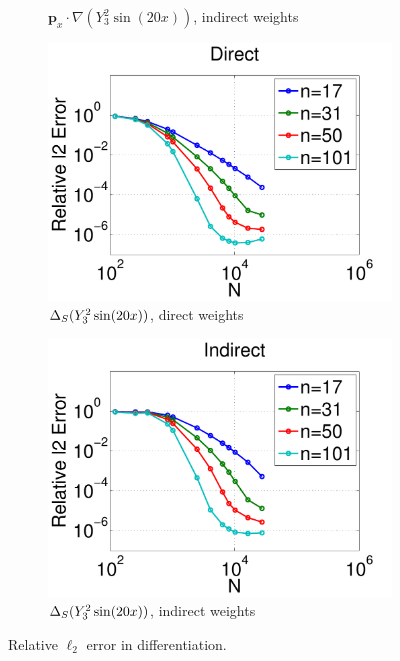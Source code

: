 \begin{figure}
\begin{subfigure}[t]{0.48\textwidth}
	\caption{$\mathbf{p}_{x} \cdot \nabla ( Y_{3}^{2} \sin(20 x))$, indirect weights}
		\label{fig:direct_vs_indirect_relative_error_xsfc_indirect}
	\end{subfigure}
	\begin{subfigure}[t]{0.48\textwidth}
	\includegraphics[width=1.0\textwidth]{../figures/appendices/direct_vs_indirect_weights/compare_weight_generation/lsfc_vs_px_grad_dot_px_grad/direct_rel_l2_error-eps-converted-to.pdf}
	\caption{$\Delta_S ( Y_{3}^{2} \sin(20 x) )$, direct weights}
			\label{fig:direct_vs_indirect_relative_error_lsfc_direct}
    \end{subfigure}
	\begin{subfigure}[t]{0.48\textwidth}
	\includegraphics[width=1.0\textwidth]{../figures/appendices/direct_vs_indirect_weights/compare_weight_generation/lsfc_vs_px_grad_dot_px_grad/indirect_rel_l2_error-eps-converted-to.pdf}
	\caption{$\Delta_S ( Y_{3}^{2} \sin(20 x) )$, indirect weights}
		\label{fig:direct_vs_indirect_relative_error_lsfc_indirect}
    \end{subfigure}
	\caption{Relative $\ell_{2}$ error in differentiation.}
	\label{fig:direct_vs_indirect_relative_error}
\end{figure}

